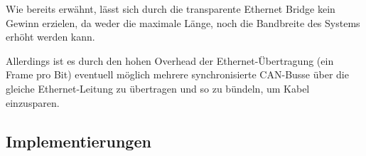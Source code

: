 Wie bereits erwähnt, lässt sich durch die transparente Ethernet Bridge kein Gewinn
erzielen, da weder die maximale Länge, noch die Bandbreite des Systems erhöht werden
kann.

Allerdings ist es durch den hohen Overhead der Ethernet-Übertragung (ein Frame pro
Bit) eventuell möglich mehrere synchronisierte CAN-Busse über die gleiche
Ethernet-Leitung zu übertragen und so zu bündeln, um Kabel einzusparen.

\subsection{Implementierungen}


\newpage {} \listoffigures

\newpage {}
% 


